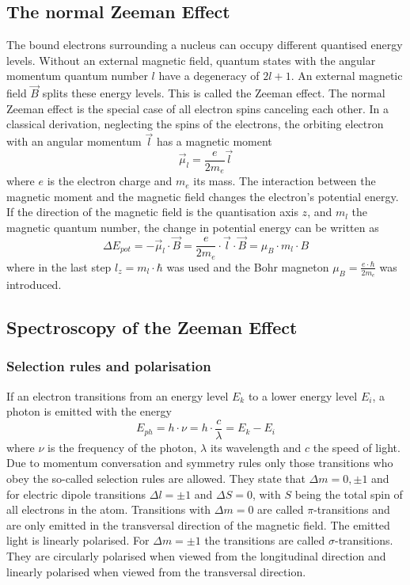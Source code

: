 \documentclass[12pt]{article}
\begin{document}
\subsection{The normal Zeeman Effect}
The bound electrons surrounding a nucleus can occupy different quantised energy levels. Without an external magnetic field, quantum states with the angular momentum quantum number $l$ have a degeneracy of $2l+1$. An external magnetic field $\vec{B}$ splits these energy levels. This is called the Zeeman effect. The normal Zeeman effect is the special case of all electron spins canceling each other. In a classical derivation, neglecting the spins of the electrons, the orbiting electron with an angular momentum $\vec{l}$ has a magnetic moment
\begin{equation}
\vec{\mu}_l=\frac{e}{2m_e}\vec{l}
\end{equation}
where $e$ is the electron charge and $m_e$ its mass. The interaction between the magnetic moment and the magnetic field changes the electron's potential energy. If the direction of the magnetic field is the quantisation axis $z$, and $m_l$ the magnetic quantum number, the change in potential energy can be written as
\begin{equation}
\Delta E_{pot}=-\vec{\mu}_l\cdot \vec{B}=\frac{e}{2m_e}\cdot\vec{l}\cdot\vec{B}=\mu_B \cdot m_l \cdot B
\end{equation}
where in the last step $l_z=m_l\cdot\hbar$ was used and the Bohr magneton $\mu_B=\frac{e\cdot\hbar}{2m_e}$ was introduced.

\subsection{Spectroscopy of the Zeeman Effect}
\subsubsection{Selection rules and polarisation}
If an electron transitions from an energy level $E_k$ to a lower energy level $E_i$, a photon is emitted with the energy
\begin{equation}
E_{ph}=h \cdot \nu=h \cdot \frac{c}{\lambda}=E_k-E_i
\label{eq:photonenergy}
\end{equation}
where $\nu$ is the frequency of the photon, $\lambda$ its wavelength and $c$ the speed of light. Due to momentum conversation and symmetry rules only those transitions who obey the so-called selection rules are allowed. They state that $\Delta m=0,\pm1$ and for electric dipole transitions $\Delta l=\pm1$ and $\Delta S=0$, with $S$ being the total spin of all electrons in the atom. Transitions with $\Delta m=0$ are called $\pi$-transitions and are only emitted in the transversal direction of the magnetic field. The emitted light is linearly polarised. For $\Delta m=\pm1$ the transitions are called $\sigma$-transitions. They are circularly polarised when viewed from the longitudinal direction and linearly polarised when viewed from the transversal direction.
\end{document}
